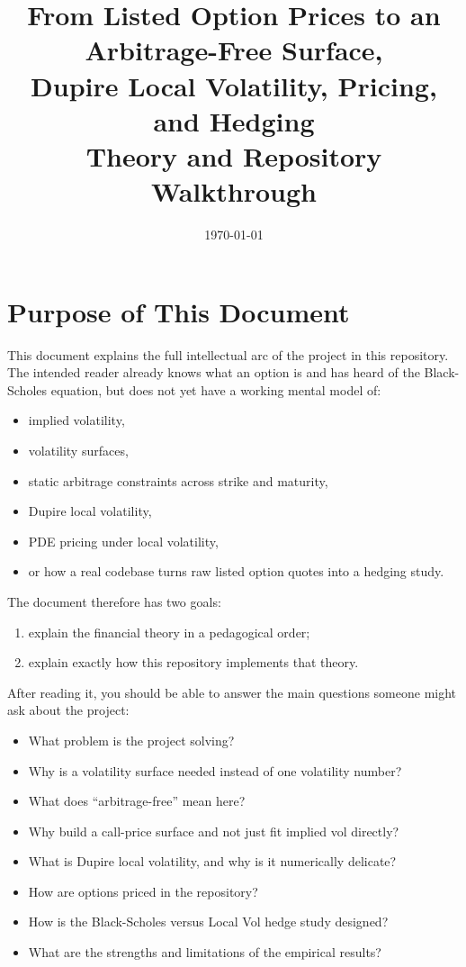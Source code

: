 \documentclass[11pt]{article}
\title{From Listed Option Prices to an Arbitrage-Free Surface,\\Dupire Local Volatility, Pricing, and Hedging\\[4pt]
\large Theory and Repository Walkthrough}
\author{}
\date{\today}
\begin{document}
\sloppy

\maketitle
\tableofcontents
\newpage

\section{Purpose of This Document}

This document explains the full intellectual arc of the project in this repository. The intended reader already knows what an option is and has heard of the Black-Scholes equation, but does not yet have a working mental model of:

\begin{itemize}
  \item implied volatility,
  \item volatility surfaces,
  \item static arbitrage constraints across strike and maturity,
  \item Dupire local volatility,
  \item PDE pricing under local volatility,
  \item or how a real codebase turns raw listed option quotes into a hedging study.
\end{itemize}

The document therefore has two goals:

\begin{enumerate}
  \item explain the financial theory in a pedagogical order;
  \item explain exactly how this repository implements that theory.
\end{enumerate}

After reading it, you should be able to answer the main questions someone might ask about the project:

\begin{itemize}
  \item What problem is the project solving?
  \item Why is a volatility surface needed instead of one volatility number?
  \item What does ``arbitrage-free'' mean here?
  \item Why build a call-price surface and not just fit implied vol directly?
  \item What is Dupire local volatility, and why is it numerically delicate?
  \item How are options priced in the repository?
  \item How is the Black-Scholes versus Local Vol hedge study designed?
  \item What are the strengths and limitations of the empirical results?
\end{itemize}
\end{document}
